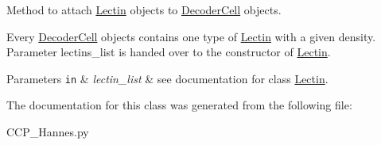 Method to attach \mbox{\hyperlink{class_c_c_p___hannes_1_1_lectin}{Lectin}} objects to \mbox{\hyperlink{class_c_c_p___hannes_1_1_decoder_cell}{Decoder\+Cell}} objects. 

Every \mbox{\hyperlink{class_c_c_p___hannes_1_1_decoder_cell}{Decoder\+Cell}} objects contains one type of \mbox{\hyperlink{class_c_c_p___hannes_1_1_lectin}{Lectin}} with a given density. Parameter lectins\+\_\+list is handed over to the constructor of \mbox{\hyperlink{class_c_c_p___hannes_1_1_lectin}{Lectin}}.


\begin{DoxyParams}[1]{Parameters}
\mbox{\tt in}  & {\em lectin\+\_\+list} & see documentation for class \mbox{\hyperlink{class_c_c_p___hannes_1_1_lectin}{Lectin}}. \\
\hline
\end{DoxyParams}


The documentation for this class was generated from the following file\+:\begin{DoxyCompactItemize}
\item 
C\+C\+P\+\_\+\+Hannes.\+py\end{DoxyCompactItemize}
